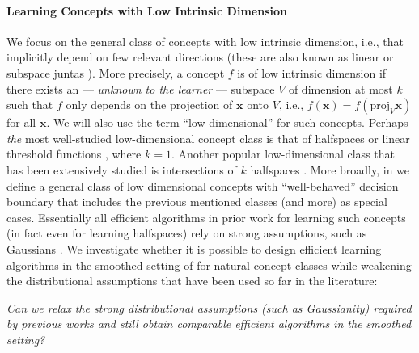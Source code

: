 \documentclass[10pt,a4paper]{article}
\renewcommand\vec[1]{\mathbf{#1}}
\newcommand{\proj}{\mathrm{proj}}
\newcommand{\eps}{\epsilon}
\newcommand{\poly}{\mathrm{poly}}
\newcommand{\1}{\Ind}
\newcommand{\x}{\vec x}
\begin{document}
\paragraph{Learning Concepts with Low Intrinsic Dimension}
We focus on the general class of concepts with low intrinsic dimension, i.e., that implicitly
depend on few relevant directions (these are also known as linear or subspace juntas \cite{vempala2011structure,de2019your,DeMN21}).
More precisely, a concept $f$ is of low intrinsic dimension if there exists
an --- \emph{unknown to the learner} --- subspace $V$ of dimension at most $k$ such that 
$f$ only depends on the projection of $\x$ onto $V$, i.e., $f(\x) = f(\proj_{V} \vec \x)$
for all $\x$. We will also use the term ``low-dimensional'' for such concepts.
Perhaps \emph{the} most well-studied low-dimensional concept
class is that of halfspaces or linear threshold functions \cite{Rosenblatt:62,MinskyPapert:88},
where $k=1$.
Another popular low-dimensional class that has been extensively studied is intersections of $k$ halfspaces \cite{DBLP:journals/jcss/BlumK97,ArriagaVempala:99,DBLP:journals/jcss/KlivansS08,KOS:08,Vempala10}.
More broadly, in  we define a general class
of low dimensional concepts with ``well-behaved'' decision boundary that includes the previous mentioned classes (and more) 
as special cases.  Essentially all efficient algorithms in prior work for learning such concepts (in fact even for learning halfspaces) rely on strong assumptions, such as Gaussians \citep{KKMS:05,KOS:08}.
We investigate whether it is possible to design efficient learning 
algorithms in the smoothed setting of  for 
natural concept classes while weakening the distributional assumptions that have been used so
far in the literature:
\begin{center}
\emph{
Can we relax the strong distributional assumptions (such as Gaussianity) required by previous works and still obtain comparable efficient algorithms in the smoothed setting?}
\end{center}
\end{document}
